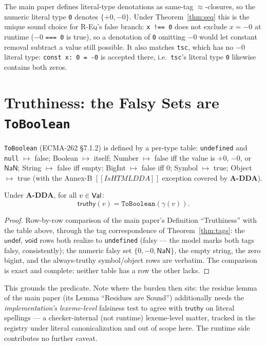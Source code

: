 \documentclass[11pt]{article}
\newcommand{\realize}{\gamma}
\newcommand{\ecma}[1]{ECMA-262 \S#1}
\newcommand{\intm}[1]{[[#1]]}
\begin{document}
\begin{corollary}
\label{cor:zero}
The main paper defines literal-type denotations as same-tag
$\approx$-closures, so the numeric literal type \texttt{0} denotes
$\{+0, -0\}$. Under Theorem~\ref{thm:seq} this is the unique sound
choice for \textsc{R-Eq}'s false branch: \texttt{x !== 0} does not
exclude $x = -0$ at runtime ($-0$ \texttt{=== 0} is \textsf{true}), so a
denotation of \texttt{0} omitting $-0$ would let constant removal
subtract a value still possible. It also matches \texttt{tsc}, which has
no $-0$ literal type: \texttt{const x: 0 = -0} is accepted there, i.e.\
\texttt{tsc}'s literal type \texttt{0} likewise contains both zeros.
\end{corollary}

\section{Truthiness: the Falsy Sets are \texttt{ToBoolean}}
\label{sec:truthy}

\texttt{ToBoolean} (\ecma{7.1.2}) is defined by a per-type table:
\texttt{undefined} and \texttt{null} $\mapsto$ \textsf{false}; Boolean
$\mapsto$ itself; Number $\mapsto$ \textsf{false} iff the value is
$+0$, $-0$, or $\mathsf{NaN}$; String $\mapsto$ \textsf{false} iff empty;
BigInt $\mapsto$ \textsf{false} iff $0$; Symbol $\mapsto$ \textsf{true};
Object $\mapsto$ \textsf{true} (with the Annex-B
$\intm{IsHTMLDDA}$ exception covered by \textbf{A-DDA}).

\begin{theorem}
\label{thm:truthy}
Under \textbf{A-DDA}, for all $v \in \mathsf{Val}$:
\[
\mathsf{truthy}(v) = \texttt{ToBoolean}(\realize(v)).
\]
\end{theorem}
\begin{proof}
Row-by-row comparison of the main paper's Definition ``Truthiness'' with
the table
above, through the tag correspondence of Theorem~\ref{thm:tags}: the
$\mathsf{undef}$, $\mathsf{void}$ rows both realize to \texttt{undefined}
(falsy — the model marks both tags falsy, consistently); the numeric
falsy set $\{0, -0, \mathsf{NaN}\}$, the empty string, the zero bigint,
and the always-truthy symbol/object rows are verbatim. The comparison is
exact and complete: neither table has a row the other lacks.
\end{proof}

This grounds the predicate. Note where the burden then sits: the residue
lemma of the main paper (its Lemma ``Residues are Sound'') additionally
needs the
\emph{implementation's lexeme-level} falsiness test to agree with
$\mathsf{truthy}$ on literal spellings — a checker-internal (not
runtime) lexeme-level matter, tracked in the registry under literal
canonicalization and out of scope here. The runtime side contributes
no further caveat.
\end{document}
